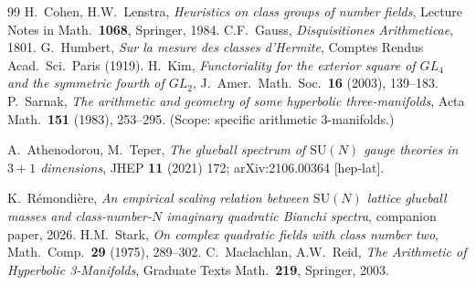 \documentclass[11pt]{article}
\theoremstyle{definition}
\begin{document}
\begin{thebibliography}{99}
 H.\ Cohen, H.W.\ Lenstra, \emph{Heuristics on class groups of number fields}, Lecture Notes in Math.\ \textbf{1068}, Springer, 1984.
 C.F.\ Gauss, \emph{Disquisitiones Arithmeticae}, 1801.
 G.\ Humbert, \emph{Sur la mesure des classes d'Hermite}, Comptes Rendus Acad.\ Sci.\ Paris (1919).
 H.\ Kim, \emph{Functoriality for the exterior square of $GL_4$ and the symmetric fourth of $GL_2$}, J.\ Amer.\ Math.\ Soc.\ \textbf{16} (2003), 139--183.
 P.\ Sarnak, \emph{The arithmetic and geometry of some hyperbolic three-manifolds}, Acta Math.\ \textbf{151} (1983), 253--295. (Scope: specific arithmetic 3-manifolds.)

 A.\ Athenodorou, M.\ Teper, \emph{The glueball spectrum of $\mathrm{SU}(N)$ gauge theories in $3+1$ dimensions}, JHEP \textbf{11} (2021) 172; arXiv:2106.00364 [hep-lat].

 K.\ R\'emondi\`ere, \emph{An empirical scaling relation between $\mathrm{SU}(N)$ lattice glueball masses and class-number-$N$ imaginary quadratic Bianchi spectra}, companion paper, 2026.
 H.M.\ Stark, \emph{On complex quadratic fields with class number two}, Math.\ Comp.\ \textbf{29} (1975), 289--302.
 C.\ Maclachlan, A.W.\ Reid, \emph{The Arithmetic of Hyperbolic 3-Manifolds}, Graduate Texts Math.\ \textbf{219}, Springer, 2003.
\end{thebibliography}
\end{document}
